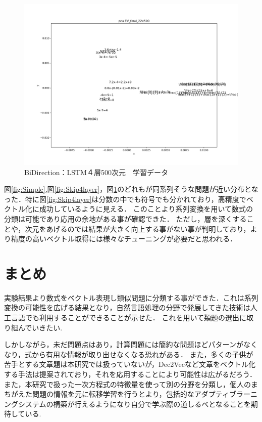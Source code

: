 \documentclass[a4paper,twocolumn]{jsarticle}
\begin{document}
\begin{center}
  \begin{figure}[tb]
    \centering
    \includegraphics[width=0.7\linewidth]{image/pca_formula_EV_final_22x500_1_Wed_Feb_06_04:57:54.png}
    \caption{BiDirection：LSTM４層500次元　学習データ}
    \label{fig:Bi500layer4}
  \end{figure}
\end{center}

図\ref{fig:Simple},図\ref{fig:Skip4layer}，図\ref{fig:Bi500layer4}のどれもが同系列そうな問題が近い分布となった．特に図\ref{fig:Skip4layer}は分数の中でも符号でも分かれており，高精度でベクトル化に成功しているように見える．
このことより系列変換を用いて数式の分類は可能であり応用の余地がある事が確認できた．
ただし，層を深くすることや，次元をあげるのでは結果が大きく向上する事がない事が判明しており，より精度の高いベクトル取得には様々なチューニングが必要だと思われる．



\section{まとめ} \label{sec:future}
実験結果より数式をベクトル表現し類似問題に分類する事ができた．これは系列変換の可能性を広げる結果となり，自然言語処理の分野で発展してきた技術は人工言語でも利用することができることが示せた．
これを用いて類題の選出に取り組んでいきたい.

しかしながら，未だ問題点はあり，計算問題には簡約な問題ほどパターンがなくなり，式から有用な情報が取り出せなくなる恐れがある．
また，多くの子供が苦手とする文章題は本研究では扱っていないが，Dec2Vec\cite{Mohler2014AND}など文章をベクトル化する手法は提案されており，それを応用することにより可能性は広がるだろう．
また，本研究で扱った一次方程式の特徴量を使って別の分野を分類し，個人のまちがえた問題の情報を元に転移学習を行うとより，包括的なアダプティブラーニングシステムの構築が行えるようになり自分で学ぶ際の道しるべとなることを期待している.



\end{document}
